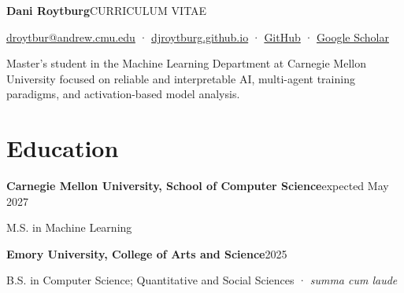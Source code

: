 \documentclass[10pt,letterpaper]{article}
\begin{document}
{\Huge\bfseries Dani Roytburg}\hfill{\small\sffamily\color{muted}CURRICULUM VITAE}\par

{\small\sffamily \href{mailto:droytbur@andrew.cmu.edu}{droytbur@andrew.cmu.edu} · \href{https://djroytburg.github.io}{djroytburg.github.io} · \href{https://github.com/djroytburg}{GitHub} · \href{https://scholar.google.com/citations?user=2auZnbUAAAAJ}{Google Scholar}}\par
Master's student in the Machine Learning Department at Carnegie Mellon University focused on reliable and interpretable AI, multi-agent training paradigms, and activation-based model analysis.
\section*{Education}
\textbf{Carnegie Mellon University, School of Computer Science}\hfill expected May 2027\par
M.S. in Machine Learning\par
\textbf{Emory University, College of Arts and Science}\hfill 2025\par
B.S. in Computer Science; Quantitative and Social Sciences · \textit{summa cum laude}\par
\end{document}
